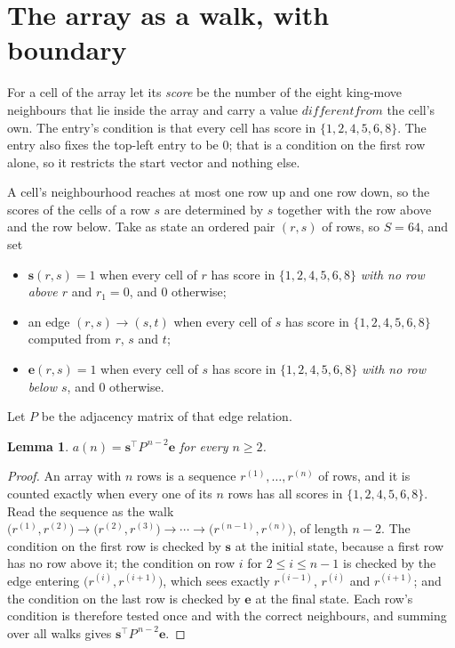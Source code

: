 \documentclass[11pt,a4paper]{article}
\theoremstyle{plain}
\newtheorem{lemma}[theorem]{Lemma}
\theoremstyle{definition}
\begin{document}
\section{The array as a walk, with boundary}

For a cell of the array let its \emph{score} be the number of the eight king-move neighbours that lie inside
the array and carry a value $different from$ the cell's own. The entry's condition is that every cell
has score in $\{1,2,4,5,6,8\}$. The entry also fixes the top-left entry to be $0$; that is a condition on the first row alone, so it restricts the start vector and nothing else.

A cell's neighbourhood reaches at most one row up and one row down, so the scores of the
cells of a row $s$ are determined by $s$ together with the row above and the row below.
Take as state an ordered pair $(r,s)$ of rows, so $S=64$, and set
\begin{itemize}
\item $\mathbf{s}(r,s)=1$ when every cell of $r$ has score in $\{1,2,4,5,6,8\}$ \emph{with no row
above $r$} and $r_1=0$, and $0$ otherwise;
\item an edge $(r,s)\to(s,t)$ when every cell of $s$ has score in $\{1,2,4,5,6,8\}$ computed from
$r$, $s$ and $t$;
\item $\mathbf{e}(r,s)=1$ when every cell of $s$ has score in $\{1,2,4,5,6,8\}$ \emph{with no row
below $s$}, and $0$ otherwise.
\end{itemize}
Let $P$ be the adjacency matrix of that edge relation.

\begin{lemma}\label{lem:walk}
$a(n)=\mathbf{s}^{\!\top}P^{\,n-2}\mathbf{e}$ for every $n\ge2$.
\end{lemma}

\begin{proof}
An array with $n$ rows is a sequence $r^{(1)},\dots,r^{(n)}$ of rows, and it is counted
exactly when every one of its $n$ rows has all scores in $\{1,2,4,5,6,8\}$. Read the sequence as the
walk $\bigl(r^{(1)},r^{(2)}\bigr)\to\bigl(r^{(2)},r^{(3)}\bigr)\to\cdots\to
\bigl(r^{(n-1)},r^{(n)}\bigr)$, of length $n-2$. The condition on the first row is
checked by $\mathbf{s}$ at the initial state, because a first row has no row above it; the
condition on row $i$ for $2\le i\le n-1$ is checked by the edge entering
$\bigl(r^{(i)},r^{(i+1)}\bigr)$, which sees exactly $r^{(i-1)}$, $r^{(i)}$ and
$r^{(i+1)}$; and the condition on the last row is checked by $\mathbf{e}$ at the final
state. Each row's condition is therefore tested once and with the correct neighbours, and
summing over all walks gives $\mathbf{s}^{\!\top}P^{\,n-2}\mathbf{e}$.
\end{proof}
\end{document}
